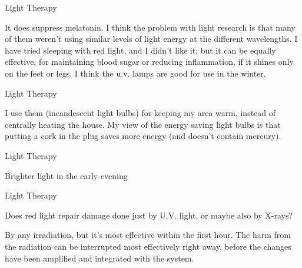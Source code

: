 \documentclass[11pt,oneside,openany,extrafontsizes]{memoir}
\begin{document}
\begin{standalonequote}{Light Therapy}

    \begin{answer}
        It does suppress melatonin. I think the problem with light research is that many of them weren't using similar levels of light energy at the different wavelengths. I have tried sleeping with red light, and I didn't like it; but it can be equally effective, for maintaining blood sugar or reducing inflammation, if it shines only on the feet or legs. I think the u.v. lamps are good for use in the winter.
    \end{answer}
\end{standalonequote}

\begin{standalonequote}{Light Therapy}

    \begin{answer}
        I use them (incandescent light bulbs) for keeping my area warm, instead of centrally heating the house. My view of the energy saving light bulbs is that putting a cork in the plug saves more energy (and doesn't contain mercury).
    \end{answer}
\end{standalonequote}

\begin{standalonequote}{Light Therapy}

    \begin{answer}
        Brighter light in the early evening
    \end{answer}
\end{standalonequote}

\begin{qaexchange}{Light Therapy}

    \begin{question}
        Does red light repair damage done just by U.V. light, or maybe also by X-rays?
    \end{question}

    \begin{answer}
        By any irradiation, but it's most effective within the first hour. The harm from the radiation can be interrupted most effectively right away, before the changes have been amplified and integrated with the system.
    \end{answer}
\end{qaexchange}
\end{document}
